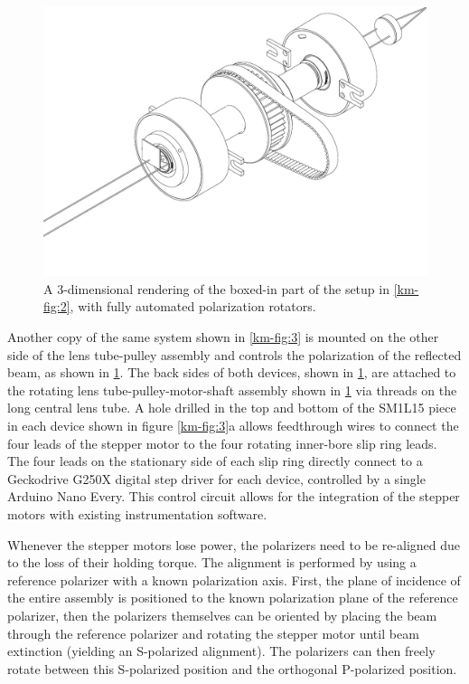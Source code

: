 \begin{figure}
\centering
\includegraphics[width=\textwidth]{gfx/ch4/km-fig4.pdf}
\caption[A 3-dimensional rendering of the automated polarization rotators]{A 3-dimensional rendering of the boxed-in part of the setup in \cref{km-fig:2}, with fully automated polarization rotators.}
\label{km-fig:6}
\end{figure}

Another copy of the same system shown in \cref{km-fig:3} is mounted on the other side of the lens tube-pulley assembly and controls the polarization of the reflected beam, as shown in \cref{km-fig:6}. 
The back sides of both devices, shown in \cref{km-fig:6}, are attached to the rotating lens tube-pulley-motor-shaft assembly shown in \cref{km-fig:6} via threads on the long central lens tube. 
A hole drilled in the top and bottom of the SM1L15 piece in each device shown in figure \cref{km-fig:3}a allows feedthrough wires to connect the four leads of the stepper motor to the four rotating inner-bore slip ring leads.
The four leads on the stationary side of each slip ring directly connect to a Geckodrive G250X digital step driver for each device, controlled by a single Arduino Nano Every.
This control circuit allows for the integration of the stepper motors with existing instrumentation software.

Whenever the stepper motors lose power, the polarizers need to be re-aligned due to the loss of their holding torque.
The alignment is performed by using a reference polarizer with a known polarization axis.
First, the plane of incidence of the entire assembly is positioned to the known polarization plane of the reference polarizer, then the polarizers themselves can be oriented by placing the beam through the reference polarizer and rotating the stepper motor until beam extinction (yielding an S-polarized alignment).  
The polarizers can then freely rotate between this S-polarized position and the orthogonal P-polarized position.

